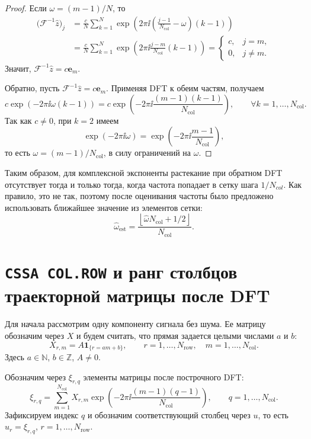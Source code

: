 \begin{proof}
Если $\omega=(m-1)/N$, то
\[
\begin{aligned}
\bigl(\mathcal F^{-1}\widehat z\bigr)_j
&=
\frac{c}{N}
\sum_{k=1}^{N}
\exp\!\left(
2\pi\ii\left(\frac{j-1}{N_{\mathrm{col}}}-\omega\right)(k-1)
\right)
\\
&=
\frac{c}{N}
\sum_{k=1}^{N}
\exp\!\left(
2\pi\ii\frac{j-m}{N_{\mathrm{col}}}(k-1)
\right)
=
\begin{cases}
c, & j=m,\\
0, & j\ne m.
\end{cases}
\end{aligned}
\]
Значит, $\mathcal F^{-1}\widehat z=c\mathbf e_m$.

Обратно, пусть $\mathcal F^{-1}\widehat z=c\mathbf e_m$. Применяя DFT к обеим
частям, получаем
\[
c\exp\!\left(-2\pi\ii\omega(k-1)\right)
=
c\exp\!\left(
-2\pi\ii\frac{(m-1)(k-1)}{N_{\mathrm{col}}}
\right),
\qquad \forall k=1,\dots,N_{\mathrm{col}}.
\]
Так как $c\ne0$, при $k=2$ имеем
\[
\exp(-2\pi\ii\omega)
=
\exp\!\left(-2\pi\ii\frac{m-1}{N_{\mathrm{col}}}\right),
\]
то есть $\omega = (m-1)/N_{\mathrm{col}}$, в силу ограничений на $\omega$.
\end{proof}

Таким образом, для комплексной экспоненты растекание при обратном DFT
отсутствует тогда и только тогда, когда частота попадает в сетку шага
$1/N_{col}$. Как правило, это не так, поэтому после оценивания частоты было
предложено использовать ближайшее значение из элементов сетки:
$$
\widehat\omega_{\text{est}} = \frac{\left\lfloor \widehat\omega N_{\mathrm{col}} + 1/2 \right\rfloor}{N_{\mathrm{col}}}.
$$

\section{\texorpdfstring{\texttt{CSSA COL.ROW}}{CSSA COL.ROW} и ранг столбцов траекторной матрицы после DFT}

Для начала рассмотрим одну компоненту сигнала без шума. Ее матрицу
обозначим через $X$ и будем считать, что прямая задается целыми числами $a$ и $b$:
\begin{equation}
    X_{r,m}
    =
    A\mathbf 1_{\{r=am+b\}},
    \qquad
    r=1,\dots,N_{\mathrm{row}},
    \quad
    m=1,\dots,N_{\mathrm{col}}.
    \label{eq:X-definition}
\end{equation}
Здесь $a\in\mathbb N$, $b\in\mathbb Z$, $A\ne0$.

Обозначим через $\xi_{r,q}$ элементы матрицы после построчного DFT:
\begin{equation}
    \xi_{r,q}
    =
    \sum_{m=1}^{N_{\mathrm{col}}}
    X_{r,m}
    \exp\left(
        -2\pi\ii\frac{(m-1)(q-1)}{N_{\mathrm{col}}}
    \right),
    \qquad
    q=1,\dots,N_{\mathrm{col}}.
    \label{eq:dft-row}
\end{equation}
Зафиксируем индекс $q$ и обозначим соответствующий столбец через
$u$, то есть $u_r=\xi_{r,q}$, $r=1,\dots,N_{\mathrm{row}}$.

